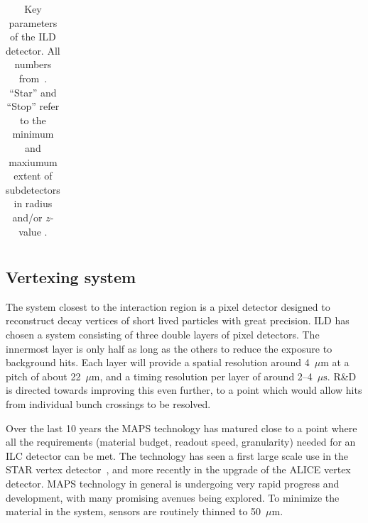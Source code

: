 \documentclass[%
 amsmath,amssymb,
 aps,
 longbibliography,
]{revtex4-1}
\newcommand{\bottomrule}{\hline}
\begin{document}
\begin{table}[th]
\begin{tabular}{|l|l|c|c|p{4cm}|}
        
\bottomrule
    \end{tabular}
    \caption{Key parameters of the ILD detector. All numbers from~\cite{Behnke:2013lya}. ``Star'' and ``Stop'' refer to the minimum and maxiumum extent of subdetectors in radius and/or $z$-value .}
    \label{ild:tab:barrelpara}
\end{table}


\subsection{Vertexing system}
The system closest to the interaction region is a pixel detector designed to reconstruct decay vertices of short lived particles with great precision. ILD has chosen a system consisting of three double layers of pixel detectors. The innermost layer is only half as long as the others to reduce the exposure to background hits. Each layer will provide a spatial resolution around 4~$\mu\mathrm{m}$ at a pitch of about 22~$\mu\mathrm{m}$, and a timing resolution per layer of around 2--4~$\mu\mathrm{s}$. R\&D is directed towards improving this even further, to a point which would allow hits from individual bunch crossings to be resolved.

Over the last 10 years the MAPS technology has matured close to a point where all the requirements (material budget, readout speed, granularity) needed for an ILC detector can be met. The technology has seen a first large scale use in the STAR vertex detector~\cite{ild:bib:VTXcps3}, and more recently in the upgrade of the ALICE vertex detector. 
MAPS technology in general is undergoing very rapid progress and development, with many promising avenues being explored. To minimize the material in the system, sensors are routinely thinned to 50~$\mu{\mathrm m}$. 
\end{document}
